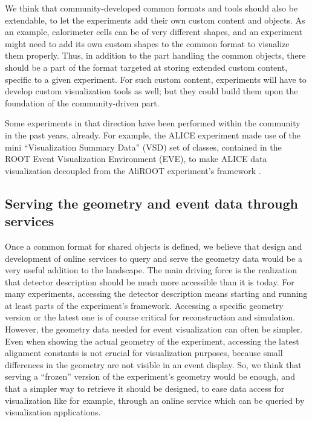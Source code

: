 \documentclass[12pt,a4paper]{article}
\begin{document}
We think that community-developed common formats and tools should also be extendable, to let the experiments add their own custom
content and objects. As an example, calorimeter cells can be of very different shapes, and an experiment might need to add its own
custom shapes to the common format to visualize them properly. Thus, in addition to the part handling the common objects, there should
be a part of the format targeted at storing extended custom content, specific to a given experiment. For such custom content,
experiments will have to develop custom visualization tools as well; but they could build them upon the foundation
of the community-driven part.

Some experiments in that direction have been performed within the community in the past years, already. For example, the
ALICE experiment made use of the mini ``Visualization Summary Data'' (VSD) set of classes, contained in the ROOT Event
Visualization Environment (EVE), to make ALICE data visualization decoupled from the AliROOT experiment’s framework \cite{TadelALICE}.

\hypertarget{serving-data}{%
\subsection{Serving the geometry and event data through services}\label{serving-data}}

Once a common format for shared objects is defined, we believe that design and development of online services to query and serve the geometry
data would be a very useful addition to the landscape. %
The main driving force is the realization that detector description should be much more accessible than it is today.
For many experiments, accessing the detector description means starting and running at least parts of the experiment’s framework.
Accessing a specific geometry version or the latest one is of course critical for reconstruction and simulation. However, the geometry
data needed for event visualization can often be simpler. Even when showing the actual geometry of the experiment, accessing the latest
alignment constants is not crucial for visualization purposes, because small differences in the geometry are not visible in an event display.
So, we think that serving a “frozen” version of the experiment’s geometry would be enough, and that a simpler way to retrieve it
should be designed, to ease data access for visualization like for example, through an online service which can be queried by visualization applications.
\end{document}
